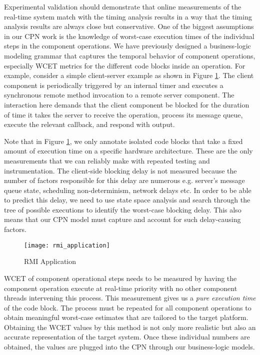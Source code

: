 Experimental validation should demonstrate that online measurements of the real-time system match with the timing analysis results in a way that the timing analysis results are always close but conservative. One of the biggest assumptions in our CPN work is the knowledge of worst-case execution times of the individual steps in the component operations. We have previously designed \cite{SEUS} a business-logic modeling grammar that captures the temporal behavior of component operations, especially WCET metrics for the different code blocks inside an operation. For example, consider a simple client-server example as shown in Figure \ref{fig:rmi_application}. The client component is periodically triggered by an internal timer and executes a synchronous remote method invocation to a remote server component. The interaction here demands that the client component be blocked for the duration of time it takes the server to receive the operation, process its message queue, execute the relevant callback, and respond with output. 

Note that in Figure \ref{fig:rmi_application}, we only annotate isolated code blocks that take a fixed amount of execution time on a specific hardware architecture. These are the only measurements that we can reliably make with repeated testing and instrumentation. The client-side blocking delay is not measured because the number of factors responsible for this delay are numerous e.g. server's message queue state, scheduling non-determinism, network delays etc. In order to be able to predict this delay, we need to use state space analysis and search through the tree of possible executions to identify the worst-case blocking delay. This also means that our CPN model must capture and account for such delay-causing factors. 

\begin{figure}[ht]
	\centering
	\texttt{[image: rmi\_application]}
	\caption{RMI Application}
	\label{fig:rmi_application}
\end{figure}

WCET of component operational steps needs to be measured by having the component operation execute at real-time priority with no other component threads intervening this process. This measurement gives us a \emph{pure execution time} of the code block. The process must be repeated for all component operations to obtain meaningful worst-case estimates that are tailored to the target platform. Obtaining the WCET values by this method is not only more realistic but also an accurate representation of the target system. Once these individual numbers are obtained, the values are plugged into the CPN through our business-logic models. 

